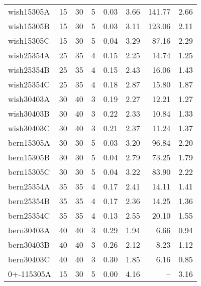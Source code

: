 \begin{scriptsize}
\begin{table}[h]
\begin{tabular*}{\linewidth}{@{\extracolsep{\fill}}lrrrrrrr@{}}
wish15305A & \num{15} & \num{30} & \num{5} & \num{0.03} & \num{3.66} & \num{141.77} & \num{2.66} \\ 
wish15305B & \num{15} & \num{30} & \num{5} & \num{0.03} & \num{3.11} & \num{123.06} & \num{2.11} \\ 
wish15305C & \num{15} & \num{30} & \num{5} & \num{0.04} & \num{3.29} & \num{87.16} & \num{2.29} \\ 
wish25354A & \num{25} & \num{35} & \num{4} & \num{0.15} & \num{2.25} & \num{14.74} & \num{1.25} \\ 
wish25354B & \num{25} & \num{35} & \num{4} & \num{0.15} & \num{2.43} & \num{16.06} & \num{1.43} \\ 
wish25354C & \num{25} & \num{35} & \num{4} & \num{0.18} & \num{2.87} & \num{15.80} & \num{1.87} \\ 
wish30403A & \num{30} & \num{40} & \num{3} & \num{0.19} & \num{2.27} & \num{12.21} & \num{1.27} \\ 
wish30403B & \num{30} & \num{40} & \num{3} & \num{0.22} & \num{2.33} & \num{10.84} & \num{1.33} \\ 
wish30403C & \num{30} & \num{40} & \num{3} & \num{0.21} & \num{2.37} & \num{11.24} & \num{1.37} \\ 
bern15305A & \num{30} & \num{30} & \num{5} & \num{0.03} & \num{3.20} & \num{96.84} & \num{2.20} \\ 
bern15305B & \num{30} & \num{30} & \num{5} & \num{0.04} & \num{2.79} & \num{73.25} & \num{1.79} \\ 
bern15305C & \num{30} & \num{30} & \num{5} & \num{0.04} & \num{3.22} & \num{83.90} & \num{2.22} \\ 
bern25354A & \num{35} & \num{35} & \num{4} & \num{0.17} & \num{2.41} & \num{14.11} & \num{1.41} \\ 
bern25354B & \num{35} & \num{35} & \num{4} & \num{0.17} & \num{2.36} & \num{14.25} & \num{1.36} \\ 
bern25354C & \num{35} & \num{35} & \num{4} & \num{0.13} & \num{2.55} & \num{20.10} & \num{1.55} \\ 
bern30403A & \num{40} & \num{40} & \num{3} & \num{0.29} & \num{1.94} & \num{6.66} & \num{0.94} \\ 
bern30403B & \num{40} & \num{40} & \num{3} & \num{0.26} & \num{2.12} & \num{8.23} & \num{1.12} \\ 
bern30403C & \num{40} & \num{40} & \num{3} & \num{0.30} & \num{1.85} & \num{6.16} & \num{0.85} \\ 
0+-115305A & \num{15} & \num{30} & \num{5} & \num{0.00} & \num{4.16} & -- & \num{3.16} \\ 

\end{tabular*}
\end{table}
\end{scriptsize}

